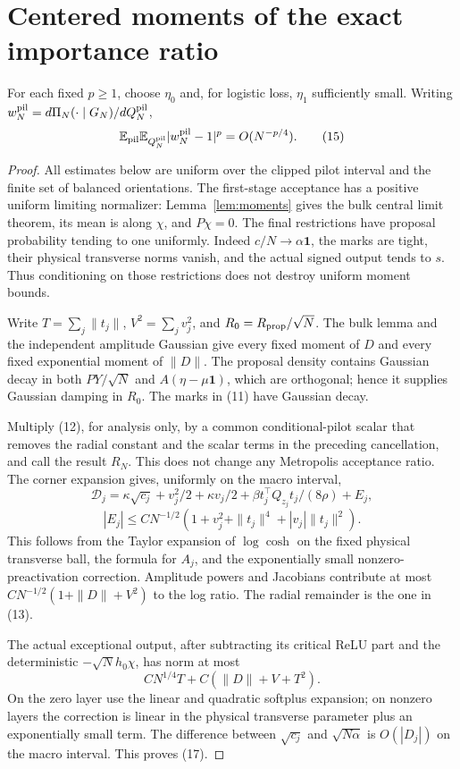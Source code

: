 \documentclass[11pt]{article}
\newcommand{\E}{\mathbb E}\newcommand{\R}{\mathbb R}
\newcommand{\one}{\mathbf1}\newcommand{\TV}{\mathrm{TV}}
\begin{document}
\section{Centered moments of the exact importance ratio}
\begin{lemma}\label{lem:ratio}
For each fixed $p\ge1$, choose $\eta_0$ and, for logistic loss,
$\eta_1$ sufficiently small. Writing
$w_N^{\rm pil}=d\Pi_N(\cdot\mid G_N)/dQ_N^{\rm pil}$,
\[
       \E_{\rm pil}\E_{Q_N^{\rm pil}}|w_N^{\rm pil}-1|^p
                                            =O(N^{-p/4}). \tag{15}
\]
\end{lemma}
\begin{proof}
All estimates below are uniform over the clipped pilot interval and the
finite set of balanced orientations. The first-stage acceptance has a
positive uniform limiting normalizer: Lemma~\ref{lem:moments} gives the
bulk central limit theorem, its mean is along $\chi$, and $P\chi=0$.
The final restrictions have proposal probability tending to one uniformly.
Indeed $c/N\to\alpha\one$, the marks are tight, their physical transverse
norms vanish, and the actual signed output tends to $s$. Thus conditioning
on those restrictions does not destroy uniform moment bounds.

Write $T=\sum_j\|t_j\|$, $V^2=\sum_jv_j^2$, and
$R_0=R_{\rm prop}/\sqrt N$. The bulk lemma and the independent amplitude
Gaussian give every fixed moment of $D$ and every fixed exponential
moment of $\|D\|$. The proposal density contains Gaussian decay in both
$PY/\sqrt N$ and $A(\eta-\mu\one)$, which are orthogonal; hence it
supplies Gaussian damping in $R_0$. The marks in (11) have Gaussian decay.

Multiply (12), for analysis only, by a common conditional-pilot scalar
that removes the radial constant and the scalar terms in the preceding
cancellation, and call the result $R_N$. This does not change any
Metropolis acceptance ratio. The corner expansion gives, uniformly on
the macro interval,
\[
 \mathcal D_j=\kappa\sqrt{c_j}+v_j^2/2+\kappa v_j/2
                 +\beta t_j^\top Q_{z_j}t_j/(8\rho)+E_j,
\]
\[
 |E_j|\le C N^{-1/2}(1+v_j^2+\|t_j\|^4+|v_j|\|t_j\|^2).
 \tag{16}
\]
This follows from the Taylor expansion of $\log\cosh$ on the fixed
physical transverse ball, the formula for $A_j$, and the exponentially
small nonzero-preactivation correction. Amplitude powers and Jacobians
contribute at most $CN^{-1/2}(1+\|D\|+V^2)$ to the log ratio.
The radial remainder is the one in (13).

The actual exceptional output, after subtracting its critical ReLU part
and the deterministic $-\sqrt N h_0\chi$, has norm at most
\[
                     C N^{1/4}T+C(\|D\|+V+T^2).         \tag{17}
\]
On the zero layer use the linear and quadratic softplus expansion;
on nonzero layers the correction is linear in the physical transverse
parameter plus an exponentially small term. The difference between
$\sqrt{c_j}$ and $\sqrt{N\alpha}$ is $O(|D_j|)$ on the macro interval.
This proves (17).


\end{proof}
\end{document}
